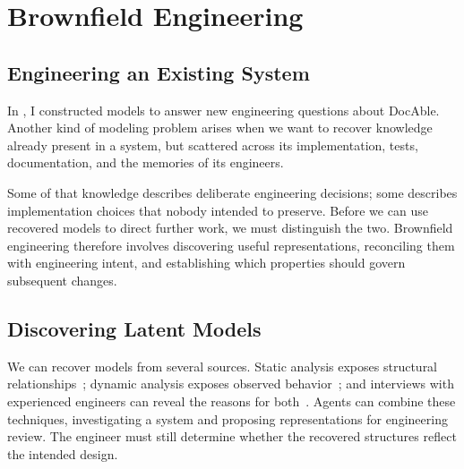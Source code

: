 


\chapter{Brownfield Engineering}

\section{Engineering an Existing System}\label{heading:start-from-the-system-you-own}


In , I constructed models to answer new engineering questions about DocAble. Another kind of modeling problem arises when we want to recover knowledge already present in a system, but scattered across its implementation, tests, documentation, and the memories of its engineers.

Some of that knowledge describes deliberate engineering decisions; some describes implementation choices that nobody intended to preserve. Before we can use recovered models to direct further work, we must distinguish the two. Brownfield engineering therefore involves discovering useful representations, reconciling them with engineering intent, and establishing which properties should govern subsequent changes.

\section{Discovering Latent Models}\label{heading:recover-latent-models}

We can recover models from several sources. Static analysis exposes structural relationships~\citep{ducasse2009architecture,garcia2013groundtruth}; dynamic analysis exposes observed behavior~\citep{cornelissen2009dynamic,ammons2002mining}; and interviews with experienced engineers can reveal the reasons for both~\citep{bjornson2008knowledge,anandayuvaraj2026failures}. Agents can combine these techniques, investigating a system and proposing representations for engineering review. The engineer must still determine whether the recovered structures reflect the intended design.

